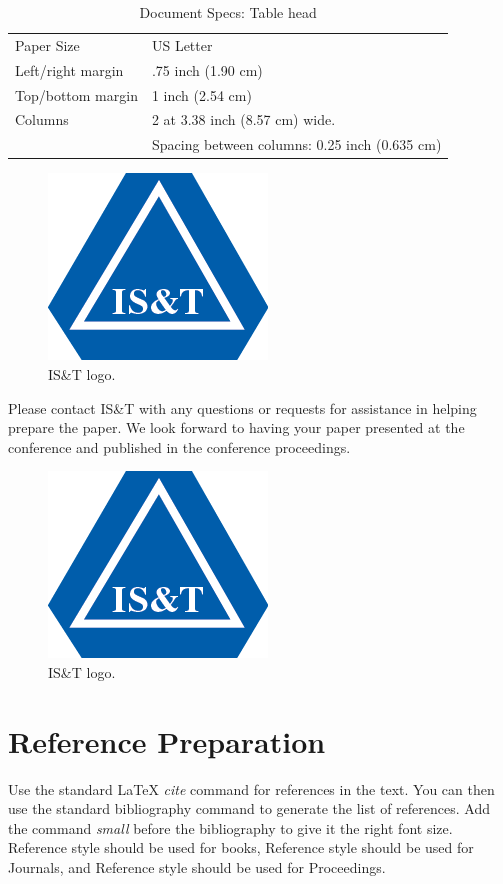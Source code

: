 \documentclass[letterpaper,twocolumn,fleqn]{article}
\begin{document}
\begin{table}[!h]
\caption{Document Specs: Table head}
\label{tab:specs}
\begin{center}       
\begin{tabular}{p{}p{}} 
Paper Size & US Letter \\
Left/right margin & .75 inch (1.90 cm) \\
Top/bottom margin & 1 inch (2.54 cm) \\
Columns & 2 at 3.38 inch (8.57 cm) wide. \\
 & Spacing between columns: 0.25 inch (0.635 cm)
\end{tabular}
\end{center}
\end{table} 

\begin{figure}[!hb]
  \includegraphics[width=0.3\columnwidth]{logo.png}
  \caption{IS\&T logo.}
  \label{Figure:logo}
\end{figure}

Please contact IS\&T with any questions or requests for assistance in
helping prepare the paper. We look forward to having your paper
presented at the conference and published in the conference
proceedings.

\begin{figure}[!hb]
  \includegraphics[width=0.3\columnwidth]{logo.png}
  \caption{IS\&T logo.}
  \label{Figure:logo}
\end{figure}


\section{Reference Preparation}
Use the standard LaTeX \emph{cite} command for references in the
text. You can then use the standard bibliography command to generate
the list of references. Add the command \emph{small} before the
bibliography to give it the right font size.  Reference \cite{bib1}
style should be used for books, Reference \cite{bib2} style should be
used for Journals, and Reference \cite{bib3} style should be used for
Proceedings.
\end{document}
